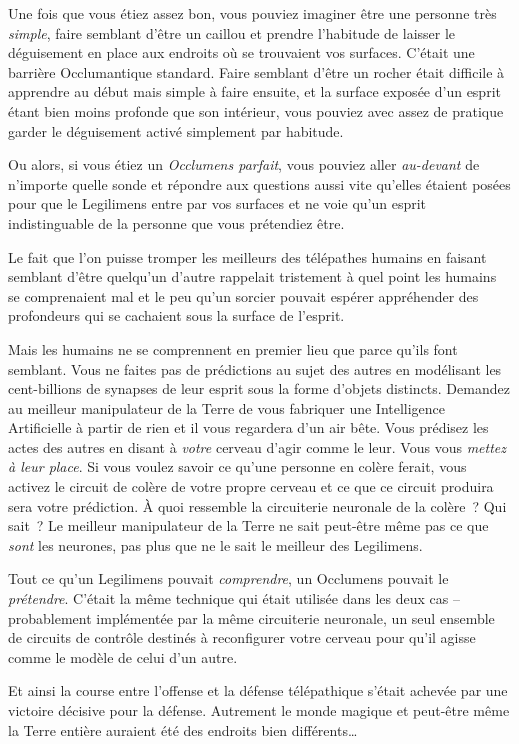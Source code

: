 Une fois que vous étiez assez bon, vous pouviez imaginer être une personne très \emph{simple}, faire semblant d'être un caillou et prendre l'habitude de laisser le déguisement en place aux endroits où se trouvaient vos surfaces. C'était une barrière Occlumantique standard. Faire semblant d'être un rocher était difficile à apprendre au début mais simple à faire ensuite, et la surface exposée d'un esprit étant bien moins profonde que son intérieur, vous pouviez avec assez de pratique garder le déguisement activé simplement par habitude.

Ou alors, si vous étiez un \emph{Occlumens parfait}, vous pouviez aller \emph{au-devant} de n'importe quelle sonde et répondre aux questions aussi vite qu'elles étaient posées pour que le Legilimens entre par vos surfaces et ne voie qu'un esprit indistinguable de la personne que vous prétendiez être.

Le fait que l'on puisse tromper les meilleurs des télépathes humains en faisant semblant d'être quelqu'un d'autre rappelait tristement à quel point les humains se comprenaient mal et le peu qu'un sorcier pouvait espérer appréhender des profondeurs qui se cachaient sous la surface de l'esprit.

Mais les humains ne se comprennent en premier lieu que parce qu'ils font semblant. Vous ne faites pas de prédictions au sujet des autres en modélisant les cent-billions de synapses de leur esprit sous la forme d'objets distincts. Demandez au meilleur manipulateur de la Terre de vous fabriquer une Intelligence Artificielle à partir de rien et il vous regardera d'un air bête. Vous prédisez les actes des autres en disant à \emph{votre} cerveau d'agir comme le leur. Vous vous \emph{mettez à leur place}. Si vous voulez savoir ce qu'une personne en colère ferait, vous activez le circuit de colère de votre propre cerveau et ce que ce circuit produira sera votre prédiction. À quoi ressemble la circuiterie neuronale de la colère~? Qui sait~? Le meilleur manipulateur de la Terre ne sait peut-être même pas ce que \emph{sont} les neurones, pas plus que ne le sait le meilleur des Legilimens.

Tout ce qu'un Legilimens pouvait \emph{comprendre}, un Occlumens pouvait le \emph{prétendre}. C'était la même technique qui était utilisée dans les deux cas -- probablement implémentée par la même circuiterie neuronale, un seul ensemble de circuits de contrôle destinés à reconfigurer votre cerveau pour qu'il agisse comme le modèle de celui d'un autre.

Et ainsi la course entre l'offense et la défense télépathique s'était achevée par une victoire décisive pour la défense. Autrement le monde magique et peut-être même la Terre entière auraient été des endroits bien différents…

